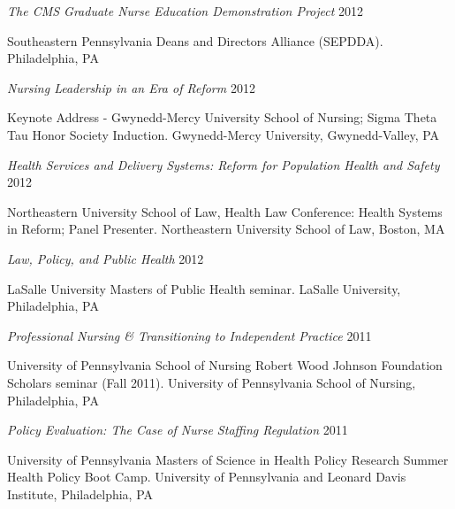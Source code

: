 \documentclass[10pt,]{article}
\begin{document}
{{{{{{{{{{{{{{\begin{hangparas}{.5in}{1}
{\textit {The CMS Graduate Nurse Education Demonstration Project}} \hfill 2012 
\vspace{-2.5mm}
\begin{adjustwidth}{0.5cm}{1cm}
Southeastern Pennsylvania Deans and Directors Alliance (SEPDDA). Philadelphia, PA
\end{adjustwidth}

{\textit {Nursing Leadership in an Era of Reform}} \hfill 2012 
\vspace{-2.5mm}
\begin{adjustwidth}{0.5cm}{1cm}
Keynote Address - Gwynedd-Mercy University School of Nursing; Sigma Theta Tau Honor Society Induction. Gwynedd-Mercy University, Gwynedd-Valley, PA
\end{adjustwidth}

{\textit {Health Services and Delivery Systems: Reform for Population Health and Safety}} \hfill 2012 
\vspace{-2.5mm}
\begin{adjustwidth}{0.5cm}{1cm}
Northeastern University School of Law, Health Law Conference: Health Systems in Reform; Panel Presenter. Northeastern University School of Law, Boston, MA
\end{adjustwidth}

{\textit {Law, Policy, and Public Health}} \hfill 2012 
\vspace{-2.5mm}
\begin{adjustwidth}{0.5cm}{1cm}
LaSalle University Masters of Public Health seminar. LaSalle University, Philadelphia, PA
\end{adjustwidth}

{\textit {Professional Nursing \& Transitioning to Independent Practice}} \hfill 2011 
\vspace{-2.5mm}
\begin{adjustwidth}{0.5cm}{1cm}
University of Pennsylvania School of Nursing Robert Wood Johnson Foundation Scholars seminar (Fall 2011). University of Pennsylvania School of Nursing, Philadelphia, PA
\end{adjustwidth}

{\textit {Policy Evaluation: The Case of Nurse Staffing Regulation}} \hfill 2011 
\vspace{-2.5mm}
\begin{adjustwidth}{0.5cm}{1cm}
University of Pennsylvania Masters of Science in Health Policy Research Summer Health Policy Boot Camp. University of Pennsylvania and Leonard Davis Institute, Philadelphia, PA
\end{adjustwidth}


\end{hangparas}}}}}}}}}}}}}}}
\end{document}
